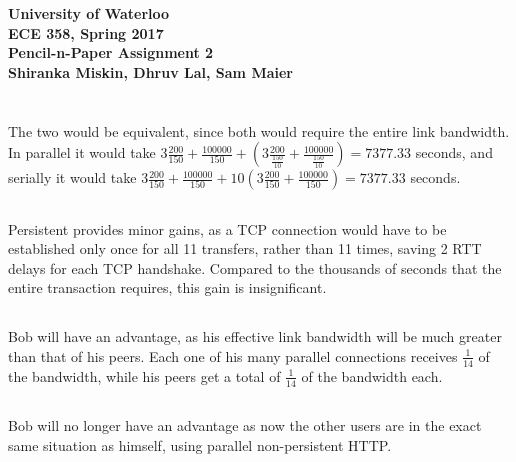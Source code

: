 \documentclass[12pt]{article}
\newcommand{\class}{ECE 358}
\newcommand{\subtitle}{Pencil-n-Paper Assignment 2}
\begin{document}
\begin{center}
{\Large\bf University of Waterloo}\\
\vspace{3mm}
{\Large\bf \class, Spring 2017}\\
\vspace{2mm}
{\Large\bf \subtitle}\\
\vspace{3mm}
\textbf{Shiranka Miskin, Dhruv Lal, Sam Maier}
\end{center}

\section{}
\subsection{}
The two would be equivalent, since both would require the entire link bandwidth.
In parallel it would take $3\frac{200}{150} + \frac{100000}{150} +
(3\frac{200}{\frac{150}{10}} + \frac{100000}{\frac{150}{10}}) = 7377.33$
seconds, and serially it would take $3\frac{200}{150} + \frac{100000}{150} +
10(3\frac{200}{150} + \frac{100000}{150}) = 7377.33$ seconds.

\subsection{}
Persistent provides minor gains, as a TCP connection would have to be
established only once for all 11 transfers, rather than 11 times, saving 2 RTT
delays for each TCP handshake.  Compared to the thousands of seconds that the
entire transaction requires, this gain is insignificant.

\subsection{}
Bob will have an advantage, as his effective link bandwidth will be much
greater than that of his peers.  Each one of his many parallel connections receives
$\frac{1}{14}$ of the bandwidth, while his peers get a total of $\frac{1}{14}$
of the bandwidth each.

\subsection{}
Bob will no longer have an advantage as now the other users are in the exact
same situation as himself, using parallel non-persistent HTTP.
\end{document}

